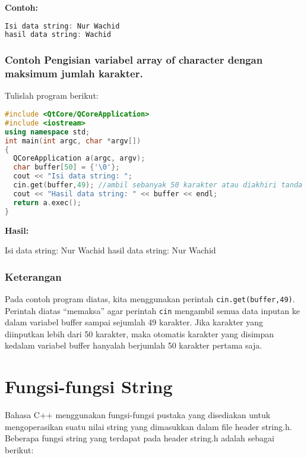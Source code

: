 \textbf{Contoh:}

\begin{lstlisting}[language=c++, numbers=none]
Isi data string: Nur Wachid
hasil data string: Wachid
\end{lstlisting}

\subsubsection*{Contoh  Pengisian variabel array of character dengan maksimum jumlah karakter.}

Tulislah program berikut:

\begin{lstlisting}[language=c++, caption=Pengisian variabel array of character dengan maksimum jumlah
karakter, label=contoh3-18]
#include <QtCore/QCoreApplication>
#include <iostream>
using namespace std;
int main(int argc, char *argv[])
{
  QCoreApplication a(argc, argv);
  char buffer[50] = {'\0'};
  cout << "Isi data string: ";
  cin.get(buffer,49); //ambil sebanyak 50 karakter atau diakhiri tanda enter
  cout << "Hasil data string: " << buffer << endl;
  return a.exec();
}
\end{lstlisting}

\textbf{Hasil:}
\begin{lcverbatim}
Isi data string: Nur Wachid
hasil data string: Nur Wachid
\end{lcverbatim}


\subsubsection*{Keterangan}

Pada contoh program diatas, kita menggunakan perintah
\texttt{cin.get(buffer,49)}. Perintah diatas ``memaksa'' agar perintah
\texttt{cin} mengambil semua data inputan ke dalam variabel buffer
sampai sejumlah 49 karakter. Jika karakter yang diinputkan lebih dari 50
karakter, maka otomatis karakter yang disimpan kedalam variabel buffer
hanyalah berjumlah 50 karakter pertama saja.

\section{Fungsi-fungsi String}\label{fungsi-fungsi-string}

Bahasa C++ menggunakan fungsi-fungsi pustaka yang disediakan untuk
mengoperasikan suatu nilai string yang dimasukkan dalam file header
string.h. Beberapa fungsi string yang terdapat pada header string.h
adalah sebagai berikut:

